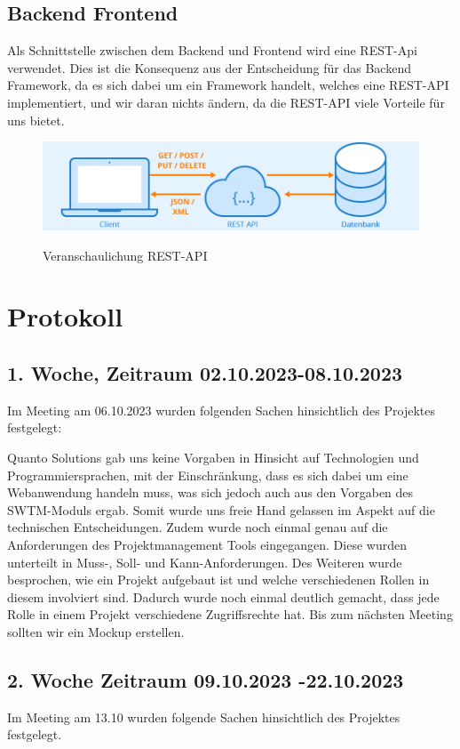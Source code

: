 \documentclass{article}
\begin{document}
\subsection{Backend Frontend}
Als Schnittstelle zwischen dem Backend und Frontend wird eine REST-Api
verwendet. Dies ist die Konsequenz aus der Entscheidung für das Backend
Framework, da es sich dabei um ein Framework handelt, welches eine REST-API
implementiert, und wir daran nichts ändern, da die REST-API viele Vorteile für
uns bietet.

\begin{figure}[h]
    \centering
    \includegraphics[width= \textwidth]{images/Rest-API.png}
    \caption{Veranschaulichung REST-API}
    \label{fig:beispiel}
    \cite{REST}
\end{figure}

\newpage

\section{Protokoll}
\subsection{1. Woche, Zeitraum 02.10.2023-08.10.2023}
Im Meeting am 06.10.2023 wurden folgenden Sachen hinsichtlich des Projektes
festgelegt:

Quanto Solutions gab uns keine Vorgaben in Hinsicht auf Technologien und
Programmiersprachen, mit der Einschränkung, dass es sich dabei um eine
Webanwendung handeln muss, was sich jedoch auch aus den Vorgaben des
SWTM-Moduls ergab. Somit wurde uns freie Hand gelassen im Aspekt auf die
technischen Entscheidungen. Zudem wurde noch einmal genau auf die Anforderungen
des Projektmanagement Tools eingegangen. Diese wurden unterteilt in Muss-,
Soll- und Kann-Anforderungen. Des Weiteren wurde besprochen, wie ein Projekt
aufgebaut ist und welche verschiedenen Rollen in diesem involviert sind.
Dadurch wurde noch einmal deutlich gemacht, dass jede Rolle in einem Projekt
verschiedene Zugriffsrechte hat. Bis zum nächsten Meeting sollten wir ein
Mockup erstellen.

\subsection{2. Woche Zeitraum 09.10.2023 -22.10.2023}
Im Meeting am 13.10 wurden folgende Sachen hinsichtlich des Projektes
festgelegt.
\end{document}
